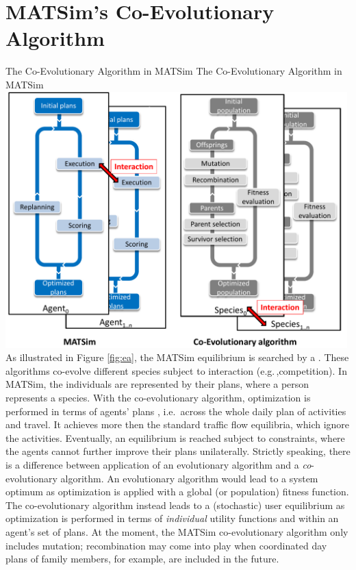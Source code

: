 \section{MATSim's Co-Evolutionary Algorithm}
\label{sec:co-ev}
%
\createfigure%
{The Co-Evolutionary Algorithm in MATSim}%
{The Co-Evolutionary Algorithm in MATSim}%
{\label{fig:ea}}%
{\includegraphics[width=0.99\textwidth, angle=0]{using/figures/MATSimVSea.pdf}}%
{}
%
%
As illustrated in Figure \ref{fig:ea}, the MATSim equilibrium is searched by a \emph{} \citep[see e.g.\,,][]{PopoviciEtAl_2012}. These \glspl{algorithm} co-evolve different species subject to interaction (e.g.\,,competition). In MATSim, the individuals are represented by their plans, where a person represents a species. With the co-evolutionary algorithm, optimization is performed in terms of agents' plans , i.e.\ across the whole daily plan of activities and travel. It achieves more then the standard traffic flow equilibria, which ignore the activities. Eventually, an equilibrium is reached subject to constraints, where the agents cannot further improve their plans unilaterally. Strictly speaking, there is a difference between application of an evolutionary algorithm and a \emph{co}-evolutionary algorithm. An evolutionary algorithm would lead to a system optimum as optimization is applied with a global (or population) fitness function. The co-evolutionary algorithm instead leads to a (stochastic) user equilibrium as optimization is performed in terms of \emph{individual} utility functions and within an agent's set of plans. At the moment, the MATSim co-evolutionary algorithm only includes mutation; recombination may come into play when coordinated day plans of family members, for example, are included in the future.

